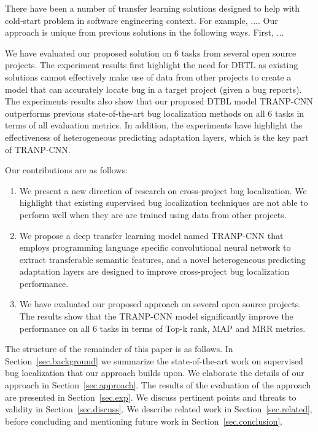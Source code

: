 There have been a number of transfer learning solutions designed to help with cold-start problem in software engineering context. For example, .... Our approach is unique from previous solutions in the following ways. First, ... 

We have evaluated our proposed solution on 6 tasks from several open source projects. The experiment results first highlight the need for DBTL as existing solutions cannot effectively make use of data from other projects to create a model that can accurately locate bug in a target project (given a bug reports). The experiments results also show that our proposed DTBL model TRANP-CNN outperforms previous state-of-the-art bug localization methods on all 6 tasks in terms of all evaluation metrics. In addition, the experiments have highlight the effectiveness of heterogeneous predicting adaptation layers, which is the key part of TRANP-CNN.

Our contributions are as follows:

\begin{enumerate}

\item We present a new direction of research on cross-project bug localization. We highlight that existing supervised bug localization techniques are not able to perform well when they are are trained using data from other projects. 
    
\item {} We propose a deep transfer learning model named TRANP-CNN that employs programming language specific convolutional neural network to extract transferable semantic features, and a novel heterogeneous predicting adaptation layers are designed to improve cross-project bug localization performance.  

\item {} We have evaluated our proposed approach on several open source projects. The results show that the TRANP-CNN model significantly improve the performance on all 6 tasks in terms of Top-k rank, MAP and MRR metrics. 


\end{enumerate}

The structure of the remainder of this paper is as follows. In Section~\ref{sec.background} we summarize the state-of-the-art work on supervised bug localization that our approach builds upon. We elaborate the details of our approach in Section~\ref{sec.approach}. The results of the evaluation of the approach are presented in Section~\ref{sec.exp}. We discuss pertinent points and threats to validity in Section~\ref{sec.discuss}. We describe related work in Section~\ref{sec.related}, before concluding and mentioning future work in Section~\ref{sec.conclusion}. 